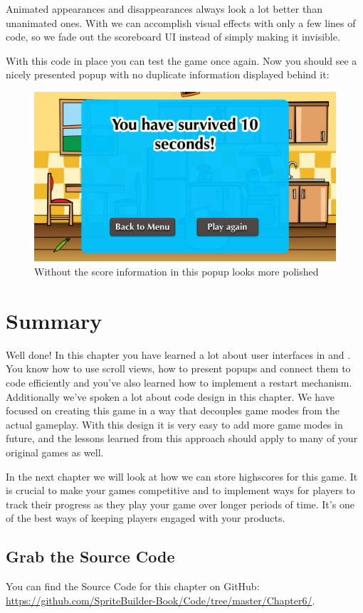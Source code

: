 Animated appearances and disappearances always look a lot better than unanimated
ones. With \cocos{} we can accomplish visual effects with only a few lines of
code, so we fade out the scoreboard UI instead of simply making it invisible.

With this code in place you can test the game once again. Now you should see a
nicely presented popup with no duplicate information displayed behind it:

\begin{figure}[H]
    \centering
    \includegraphics[width=0.75\linewidth]{images/Chapter7/ui_fadeout_popup.png}
    \caption{Without the score information in  this popup
    looks more polished}
\end{figure}

\section{Summary} 

Well done! In this chapter you have learned a lot about user interfaces in \SB{}
and \cocos{}. You know how to use scroll views, how to present popups and
connect them to code efficiently and you've also learned how to implement a
restart mechanism. Additionally we've spoken a lot about code design in this
chapter. We have focused on creating this game in a way that decouples game
modes from the actual gameplay. With this design it is very easy to add more
game modes in future, and the lessons learned from this approach should apply to
many of your original games as well.

In the next chapter we will look at how we can store highscores for this game.
It is crucial to make your games competitive and to implement ways for players
to track their progress as they play your game over longer periods of time. It's
one of the best ways of keeping players engaged with your products.

\subsection{Grab the Source Code}
You can find the Source Code for this chapter on GitHub:
\url{https://github.com/SpriteBuilder-Book/Code/tree/master/Chapter6/}.